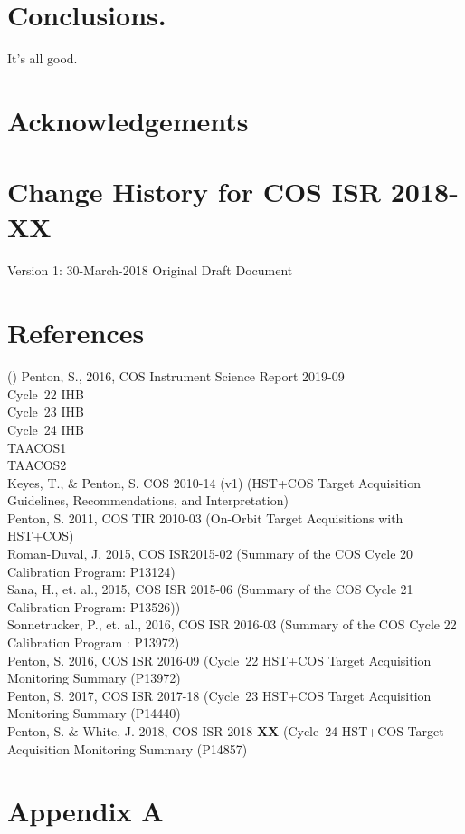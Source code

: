 \documentclass{stsci_report}
\begin{document}
\section{Conclusions.\label{theend} }
\vspace{-0.3cm}
	It's all good.

\clearpage
\vspace{-0.3cm}
\section*{Acknowledgements}
\vspace{-0.3cm}
\vspace{0.3cm}
\section*{Change History for COS ISR 2018-XX}\label{sec:History}
\vspace{0.3cm}
Version 1: 30-March-2018 Original Draft Document
\vspace{0.3cm}
\section*{References}\label{sec:References}
\vspace{0.3cm}

\noindent ()
Penton, S., 2016, COS Instrument Science Report 2019-09\\
Cycle~22 IHB\\
Cycle~23 IHB\\
Cycle~24 IHB\\
TAACOS1\\
TAACOS2\\
Keyes, T., \& Penton, S. COS 2010-14 (v1) (HST+COS Target Acquisition Guidelines, Recommendations, and Interpretation)\\
Penton, S. 2011, COS TIR 2010-03 (On-Orbit Target Acquisitions with HST+COS)\\
Roman-Duval, J, 2015, COS ISR2015-02 (Summary of the COS Cycle 20 Calibration Program: P13124)\\
Sana, H., et. al., 2015, COS ISR 2015-06 (Summary of the COS Cycle 21 Calibration Program: P13526))\\
Sonnetrucker, P., et. al., 2016, COS ISR 2016-03 (Summary of the COS Cycle 22 Calibration Program : P13972) \\
Penton, S. 2016, COS ISR 2016-09 (Cycle~22 HST+COS Target Acquisition Monitoring Summary (P13972)\\
Penton, S. 2017, COS ISR 2017-18 (Cycle~23 HST+COS Target Acquisition Monitoring Summary (P14440)\\
Penton, S. \& White, J. 2018, COS ISR 2018-{\bf XX} (Cycle~24 HST+COS Target Acquisition Monitoring Summary (P14857)\\
\newpage
\vspace{-0.3cm}
\section*{Appendix A}\label{sec:Appendix}
\vspace{-0.3cm}
\end{document}
